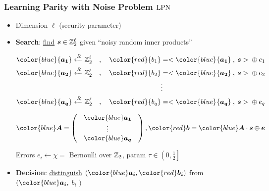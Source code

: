 \begin{frame}
\frametitle{Learning Parity with Noise Problem $\mathrm{LPN}$}
\begin{itemize}
 \item Dimension $\ell$ (security parameter)
 \item \textbf{Search}: \underline{find}  $ \boldsymbol{s} \in \mathbb{Z}_2^{\ell}$ given ``noisy random inner products'' \\
 \begin{overprint}
 \begin{align*}
  {\color{blue}{\vect{a_1}}} \R \zol \quad , \quad {\color{red}{b_1}} &= <{\color{blue}{\vect{a_1}}} \: , \: \vect{s}> \: \xor \: e_1 \\
  {\color{blue}{\vect{a_2}}} \R \zol \quad, \quad  {\color{red}{b_2}} &= <{\color{blue}{\vect{a_2}}} \: , \: \vect{s}> \: \xor \: e_2 \\
   & \vdots \\
   {\color{blue}{\vect{a_q}}} \R \zol \quad, \quad  {\color{red}{b_q}} &= <{\color{blue}{\vect{a_q}}} \: , \: \vect{s}> \: \xor \: e_q \\
  \end{align*}

  \vspace*{25pt}
\[
{\color{blue} \vect{A}} = \begin{pmatrix}
            & {\color{blue}\vect{a_1}} & \\
            & \vdots  & \\ 
            & {\color{blue}\vect{a_q}} & 
           \end{pmatrix}  , {\color{red} \vect{b}} = {\color{blue} \vect{A}} \cdot \vect{s} \xor \vect{e} 
\]
 \end{overprint}
  Errors $e_i \gets \chi =$ Bernoulli over $\mathbb{Z}_2$, param $\tau \in \left( 0,\frac{1}{2} \right] $ 
 \item \textbf{Decision}: \underline{distinguish} $\left( {\color{blue}\vect{a_i}}, {\color{red}\vect{b_i}} \right)$ from {\color{blue}{uniform}} $( {\color{blue}\vect{a_i}}, $ {\color{blue} $b_i$} $)$
 \end{itemize}
\end{frame}


